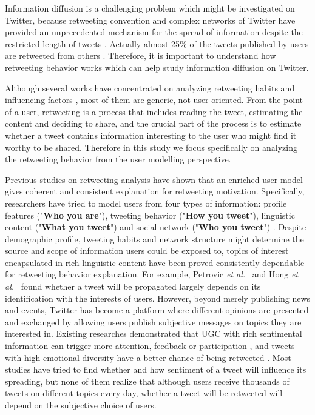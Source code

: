 \documentclass[twocolumn]{svjour3}          %
\begin{document}
Information diffusion is a challenging problem which might be investigated on Twitter, because retweeting convention and complex networks of Twitter have provided an unprecedented mechanism for the spread of information despite the restricted length of tweets \cite{Jenders:2013APV}. 
Actually almost 25\% of the tweets published by users are retweeted from others \cite{conf/cikm/YangGCTLZS10}. 
Therefore, it is important to understand how retweeting behavior works which can help study information diffusion on Twitter. 

Although several works have concentrated on analyzing retweeting habits and influencing factors \cite{Boyd2010,Kwak:2010TSN,Suh2010}, most of them are generic, not user-oriented.
From the point of a user, retweeting is a process that includes reading the tweet, estimating the content and deciding to share, and the crucial part of the process is to estimate whether a tweet contains information interesting to the user who might find it worthy to be shared.
Therefore in this study we focus specifically on analyzing the retweeting behavior from the user modelling perspective.

Previous studies on retweeting analysis have shown that an enriched user model gives coherent and consistent explanation for retweeting motivation\cite{Abel:2011AUM,conf/icwsm/MacskassyM11,conf/wsdm/FengW13}. 
Specifically, researchers have tried to model users from four types of information:
profile features ("\textbf{Who you are}"), tweeting behavior ("\textbf{How you tweet}"), linguistic content ("\textbf{What you tweet}") and social network ("\textbf{Who you tweet}") \cite{Pennacchiotti:icwsm11}. 
Despite demographic profile, tweeting habits and network structure might determine the source and scope of information users could be exposed to, topics of interest encapsulated in rich linguistic content have been proved consistently dependable for retweeting behavior explanation. 
For example, Petrovic \emph{et al.}~\cite{Osborne_Lavrenko_2011} and Hong \emph{et al.}~\cite{ericmedvet:hong2011} found whether a tweet will be propagated largely depends on its identification with the interests of users. 
However, beyond merely publishing news and events, Twitter has become a platform where different opinions are presented and exchanged by allowing users publish subjective messages on topics they are interested in. 
Existing researches demonstrated that UGC with rich sentimental information can trigger more attention, feedback or participation \cite{DBLP:conf/hicss/StieglitzD12}, and tweets with high emotional diversity have a better chance of being retweeted \cite{conf/icwsm/PfitznerGS12}.
Most studies have tried to find whether and how sentiment of a tweet will influence its spreading, but none of them realize that although users receive thousands of tweets on different topics every day, whether a tweet will be retweeted will depend on the subjective choice of users. 
\end{document}
